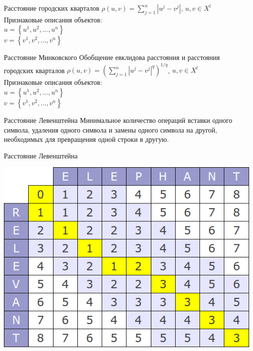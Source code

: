 \documentclass[10pt]{beamer}
\begin{document}
{
\begin{frame}{Расстояние городских кварталов}
	${\rho (u, v) = \sum\limits_{j=1}^n |u^j - v^j|}$, \hspace{5mm} ${u, v \in X^{l}}$\\
	\bigbreak
	\bigbreak
	Признаковые описания объектов:\\
	${u = \left\{ u^1, u^2, ..., u^n \right\}}$ \\
	${v = \left\{v^1, v^2, ..., v^n \right\} }$ 
\end{frame}
}

{
\begin{frame}{Расстояние Минковского}
	Обобщение евклидова расстояния и расстояния городских кварталов
	\bigbreak
	${\rho (u, v) = (\sum\limits_{j=1}^n |u^j - v^j|^q)^{1/q}}$, \hspace{5mm} ${u, v \in X^{l}}$\\
	\bigbreak
	\bigbreak
	Признаковые описания объектов:\\
	${u = \left\{ u^1, u^2, ..., u^n \right\}}$ \\
	${v = \left\{v^1, v^2, ..., v^n \right\} }$ 
\end{frame}
}

{
\begin{frame}{Расстояние Левенштейна}
	Минимальное количество операций вставки одного символа, удаления одного символа и замены одного символа на другой, необходимых для превращения одной строки в другую.
\end{frame}
}

\begin{frame}{Расстояние Левенштейна}
	\begin{center}
	  \includegraphics[width=\textwidth]{images/levenshtein}
	\end{center}
\end{frame}
\end{document}
